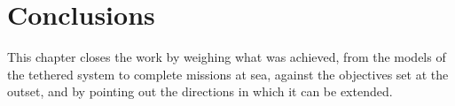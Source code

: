 
\chapter{Conclusions}
\label{chapter:conclusions}

This chapter closes the work by weighing what was achieved, from the models of the tethered system to complete missions at sea, against the objectives set at the outset, and by pointing out the directions in which it can be extended.



